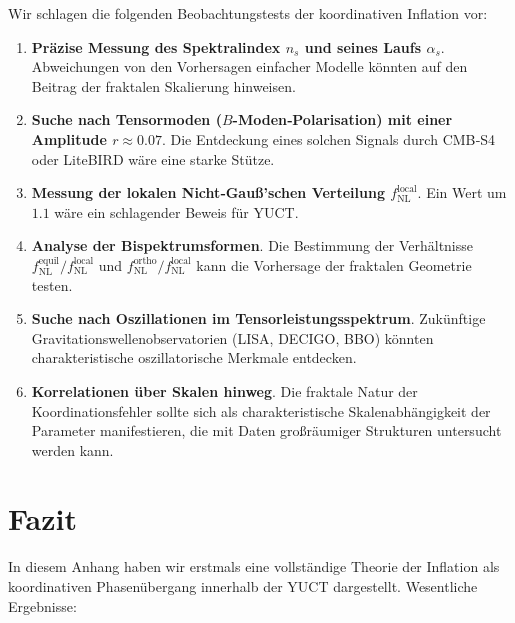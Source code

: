 \documentclass[12pt]{article}
\theoremstyle{remark}
\begin{document}
	Wir schlagen die folgenden Beobachtungstests der koordinativen Inflation vor:
	
	\begin{enumerate}
		\item \textbf{Präzise Messung des Spektralindex $n_s$ und seines Laufs $\alpha_s$}. Abweichungen von den Vorhersagen einfacher Modelle könnten auf den Beitrag der fraktalen Skalierung hinweisen.
		\item \textbf{Suche nach Tensormoden ($B$-Moden‑Polarisation) mit einer Amplitude $r \approx 0.07$}. Die Entdeckung eines solchen Signals durch CMB‑S4 oder LiteBIRD wäre eine starke Stütze.
		\item \textbf{Messung der lokalen Nicht‑Gauß’schen Verteilung $f_{\text{NL}}^{\text{local}}$}. Ein Wert um $1.1$ wäre ein schlagender Beweis für YUCT.
		\item \textbf{Analyse der Bispektrumsformen}. Die Bestimmung der Verhältnisse $f_{\text{NL}}^{\text{equil}}/f_{\text{NL}}^{\text{local}}$ und $f_{\text{NL}}^{\text{ortho}}/f_{\text{NL}}^{\text{local}}$ kann die Vorhersage der fraktalen Geometrie testen.
		\item \textbf{Suche nach Oszillationen im Tensorleistungsspektrum}. Zukünftige Gravitationswellenobservatorien (LISA, DECIGO, BBO) könnten charakteristische oszillatorische Merkmale entdecken.
		\item \textbf{Korrelationen über Skalen hinweg}. Die fraktale Natur der Koordinationsfehler sollte sich als charakteristische Skalenabhängigkeit der Parameter manifestieren, die mit Daten großräumiger Strukturen untersucht werden kann.
	\end{enumerate}
	
	\section{Fazit}
	\label{sec:conclusion}
	
	In diesem Anhang haben wir erstmals eine vollständige Theorie der Inflation als koordinativen Phasenübergang innerhalb der YUCT dargestellt. Wesentliche Ergebnisse:
	
\end{document}
